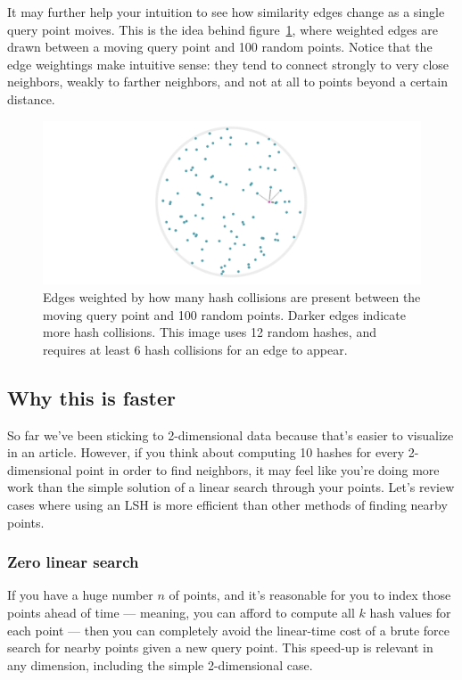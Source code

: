 \documentclass[20pt,]{extarticle}
\begin{document}
It may further help your intuition to see how similarity edges change as
a single query point moives. This is the idea behind
figure~\ref{fig:fig8b}, where weighted edges are drawn between a moving
query point and 100 random points. Notice that the edge weightings make
intuitive sense: they tend to connect strongly to very close neighbors,
weakly to farther neighbors, and not at all to points beyond a certain
distance.

\begin{figure}
\centering
\includegraphics{images/image8b@2x.gif}
\caption{Edges weighted by how many hash collisions are present between
the moving query point and 100 random points. Darker edges indicate more
hash collisions. This image uses 12 random hashes, and requires at least
6 hash collisions for an edge to appear.}\label{fig:fig8b}
\end{figure}

\subsection{Why this is faster}\label{why-this-is-faster}

So far we've been sticking to 2-dimensional data because that's easier
to visualize in an article. However, if you think about computing 10
hashes for every 2-dimensional point in order to find neighbors, it may
feel like you're doing more work than the simple solution of a linear
search through your points. Let's review cases where using an LSH is
more efficient than other methods of finding nearby points.

\subsubsection{Zero linear search}\label{zero-linear-search}

If you have a huge number \(n\) of points, and it's reasonable for you
to index those points ahead of time --- meaning, you can afford to
compute all \(k\) hash values for each point --- then you can completely
avoid the linear-time cost of a brute force search for nearby points
given a new query point. This speed-up is relevant in any dimension,
including the simple 2-dimensional case.
\end{document}
